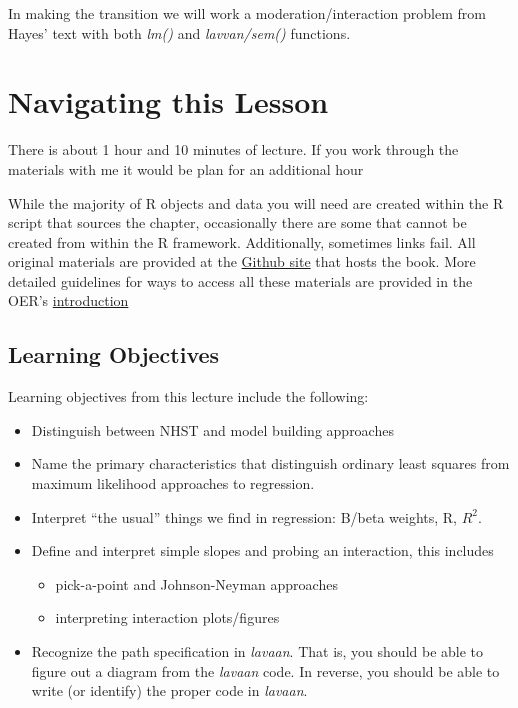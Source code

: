 \documentclass[
  11pt,
]{book}
\providecommand{\tightlist}{%
  \setlength{\itemsep}{0pt}\setlength{\parskip}{0pt}}
\begin{document}
In making the transition we will work a moderation/interaction problem from Hayes' text with both \emph{lm()} and \emph{lavvan/sem()} functions.

\hypertarget{navigating-this-lesson-6}{%
\section{Navigating this Lesson}\label{navigating-this-lesson-6}}

There is about 1 hour and 10 minutes of lecture. If you work through the materials with me it would be plan for an additional hour

While the majority of R objects and data you will need are created within the R script that sources the chapter, occasionally there are some that cannot be created from within the R framework. Additionally, sometimes links fail. All original materials are provided at the \href{https://github.com/lhbikos/ReC_MultivModel}{Github site} that hosts the book. More detailed guidelines for ways to access all these materials are provided in the OER's \protect\hyperlink{ReCintro}{introduction}

\hypertarget{learning-objectives-6}{%
\subsection{Learning Objectives}\label{learning-objectives-6}}

Learning objectives from this lecture include the following:

\begin{itemize}
\tightlist
\item
  Distinguish between NHST and model building approaches
\item
  Name the primary characteristics that distinguish ordinary least squares from maximum likelihood approaches to regression.
\item
  Interpret ``the usual'' things we find in regression: B/beta weights, R, \(R^{2}\).
\item
  Define and interpret simple slopes and probing an interaction, this includes

  \begin{itemize}
  \tightlist
  \item
    pick-a-point and Johnson-Neyman approaches
  \item
    interpreting interaction plots/figures
  \end{itemize}
\item
  Recognize the path specification in \emph{lavaan}. That is, you should be able to figure out a diagram from the \emph{lavaan} code. In reverse, you should be able to write (or identify) the proper code in \emph{lavaan}.
\end{itemize}
\end{document}
